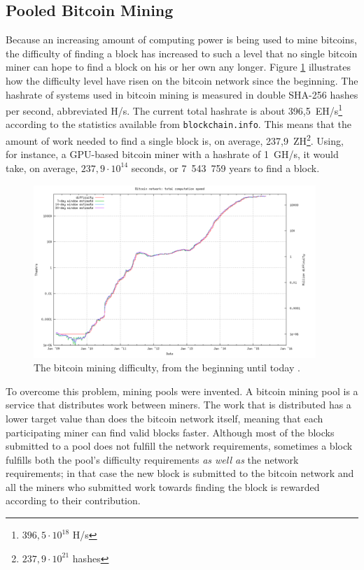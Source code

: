 \subsection{Pooled Bitcoin Mining}

Because an increasing amount of computing power is being used to mine bitcoins, the difficulty of finding
a block has increased to such a level that no single bitcoin miner can hope to find a block on his or her
own any longer. Figure \ref{fig:difficulty} illustrates how the difficulty level have risen on the bitcoin network
since the beginning. The hashrate of systems used in bitcoin mining is measured in double SHA-256 hashes per second,
abbreviated H/s. The current total hashrate is about 396,5~EH/s\footnote{$396,5\cdot 10^{18}$ H/s} according to the
statistics available from \texttt{blockchain.info}. This means that the amount of work needed to find a single block is,
on average, 237,9~ZH\footnote{$237,9\cdot 10^{21}$ hashes}. Using, for instance, a GPU-based bitcoin miner with a
hashrate of 1~GH/s, it would take, on average, $237,9\cdot 10^{14}$ seconds, or 7~543~759 years to find a block.

\begin{figure}[htb]
    \centering
    \includegraphics[width=0.95\textwidth]{Figures/Bitcoin/Difficulty-all}
    \caption{The bitcoin mining difficulty, from the beginning until today \cite{bitcoin-charts}.}
    \label{fig:difficulty}
\end{figure}

To overcome this problem, mining pools were invented. A bitcoin mining pool is a service that distributes
work between miners. The work that is distributed has a lower target value than does the bitcoin network
itself, meaning that each participating miner can find valid blocks faster. Although most of the blocks
submitted to a pool does not fulfill the network requirements, sometimes a block fulfills both the
pool's difficulty requirements \emph{as well as} the network requirements; in that case the new block is
submitted to the bitcoin network and all the miners who submitted work towards finding the block
is rewarded according to their contribution.


